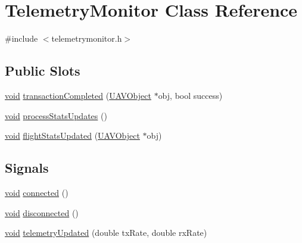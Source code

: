\hypertarget{class_telemetry_monitor}{\section{\-Telemetry\-Monitor \-Class \-Reference}
\label{class_telemetry_monitor}
}


{\ttfamily \#include $<$telemetrymonitor.\-h$>$}

\subsection*{\-Public \-Slots}
\begin{DoxyCompactItemize}
\item 
\hyperlink{group___u_a_v_objects_plugin_ga444cf2ff3f0ecbe028adce838d373f5c}{void} \hyperlink{group___u_a_v_talk_plugin_ga2b5452341c351cd2d67c46469b855607}{transaction\-Completed} (\hyperlink{class_u_a_v_object}{\-U\-A\-V\-Object} $\ast$obj, bool success)
\item 
\hyperlink{group___u_a_v_objects_plugin_ga444cf2ff3f0ecbe028adce838d373f5c}{void} \hyperlink{group___u_a_v_talk_plugin_ga2e16b3d1a298f851879d22749d1e38e9}{process\-Stats\-Updates} ()
\item 
\hyperlink{group___u_a_v_objects_plugin_ga444cf2ff3f0ecbe028adce838d373f5c}{void} \hyperlink{group___u_a_v_talk_plugin_ga31c0b7ae632d68a5584d1f0696e35766}{flight\-Stats\-Updated} (\hyperlink{class_u_a_v_object}{\-U\-A\-V\-Object} $\ast$obj)
\end{DoxyCompactItemize}
\subsection*{\-Signals}
\begin{DoxyCompactItemize}
\item 
\hyperlink{group___u_a_v_objects_plugin_ga444cf2ff3f0ecbe028adce838d373f5c}{void} \hyperlink{group___u_a_v_talk_plugin_gac4e867b78642d4f1fe27c5fc97468ce7}{connected} ()
\item 
\hyperlink{group___u_a_v_objects_plugin_ga444cf2ff3f0ecbe028adce838d373f5c}{void} \hyperlink{group___u_a_v_talk_plugin_ga8445fbd983df4d054bb798c760ba0640}{disconnected} ()
\item 
\hyperlink{group___u_a_v_objects_plugin_ga444cf2ff3f0ecbe028adce838d373f5c}{void} \hyperlink{group___u_a_v_talk_plugin_gac7898d4b74305c568adefb289da72ebc}{telemetry\-Updated} (double tx\-Rate, double rx\-Rate)
\end{DoxyCompactItemize}

